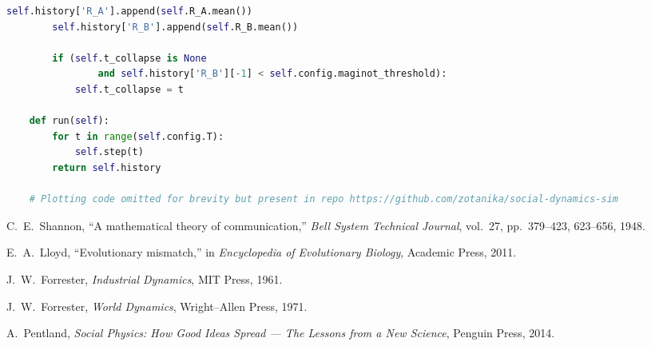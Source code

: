 \documentclass[11pt]{article}
\theoremstyle{plain}
\begin{document}
\begin{lstlisting}[language=Python, caption=Social Dynamics Simulation Code]
        self.history['R_A'].append(self.R_A.mean())
        self.history['R_B'].append(self.R_B.mean())

        if (self.t_collapse is None 
                and self.history['R_B'][-1] < self.config.maginot_threshold):
            self.t_collapse = t

    def run(self):
        for t in range(self.config.T):
            self.step(t)
        return self.history
    
    # Plotting code omitted for brevity but present in repo https://github.com/zotanika/social-dynamics-sim
\end{lstlisting}

\begin{thebibliography}{9}

C.~E.~Shannon,
``A mathematical theory of communication,''
\emph{Bell System Technical Journal}, vol.~27, pp.~379--423, 623--656, 1948.

E.~A.~Lloyd,
``Evolutionary mismatch,''
in \emph{Encyclopedia of Evolutionary Biology},
Academic Press, 2011.

J.~W.~Forrester,
\emph{Industrial Dynamics},
MIT Press, 1961.

J.~W.~Forrester,
\emph{World Dynamics},
Wright--Allen Press, 1971.

A.~Pentland,
\emph{Social Physics: How Good Ideas Spread --- The Lessons from a New Science},
Penguin Press, 2014.

\end{thebibliography}
\end{document}
